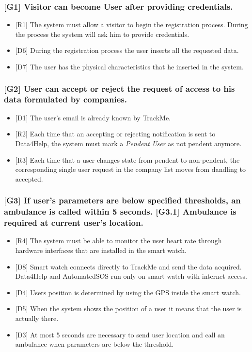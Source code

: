 \documentclass{article}
\begin{document}
\subsubsection{[G1] Visitor can become User after providing credentials.}
\begin{itemize}
\item {[R1]} The system must allow a visitor to begin the registration process. During the process the system will ask him to provide credentials.
\item {[D6]} During the registration process the user inserts all the requested data.
\item {[D7]} The user has the physical characteristics that he inserted in the system.
\end{itemize}
\subsubsection{[G2] User can accept or reject the request of access to his data formulated by companies.}
\begin{itemize}
\item {[D1]} The user's email is already known by TrackMe.
\item {[R2]} Each time that an accepting or rejecting notification is sent to Data4Help, the system must mark a \emph{Pendent User} as not pendent anymore.
\item {[R3]} Each time that a user changes state from pendent to non-pendent, the corresponding single user request in the company list moves from dandling to accepted.
\end{itemize}
\subsubsection{[G3] If user's parameters are below specified thresholds, an ambulance is called within 5 seconds. [G3.1] Ambulance is required at current user's location.}
\begin{itemize}
\item {[R4]} The system must be able to monitor the user heart rate through hardware interfaces that are installed in the smart watch.
\item {[D8]} Smart watch connects directly to TrackMe and send the data acquired. Data4Help and AutomatedSOS run only on smart watch with internet access.
\item {[D4]} Users position is determined by using the GPS inside the smart watch.
\item {[D5]} When the system shows the position of a user it means that the user is actually there.
\item {[D3]} At most 5 seconds are necessary to send user location and call an ambulance when parameters are below the threshold.
\end{itemize}
\end{document}
